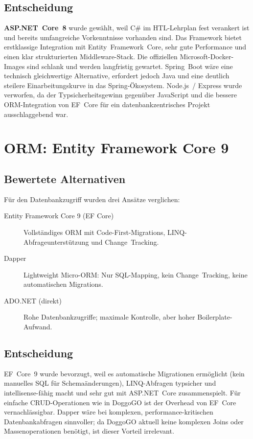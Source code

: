 \subsection{Entscheidung}
\label{subsec:aspnet-entscheidung}

\textbf{ASP.NET~Core~8} wurde gewählt, weil C\# im HTL-Lehrplan fest verankert ist und
bereits umfangreiche Vorkenntnisse vorhanden sind. Das Framework bietet erstklassige
Integration mit Entity~Framework~Core, sehr gute Performance und einen klar strukturierten
Middleware-Stack. Die offiziellen Microsoft-Docker-Images sind schlank und werden langfristig
gewartet. Spring~Boot wäre eine technisch gleichwertige Alternative, erfordert jedoch Java
und eine deutlich steilere Einarbeitungskurve in das Spring-Ökosystem. Node.js~/ Express
wurde verworfen, da der Typsicherheitsgewinn gegenüber JavaScript und die bessere
ORM-Integration von EF~Core für ein datenbankzentrisches Projekt ausschlaggebend war.

\section{ORM: Entity Framework Core 9}
\label{sec:efcore}

\subsection{Bewertete Alternativen}
\label{subsec:orm-alternativen}

Für den Datenbankzugriff wurden drei Ansätze verglichen:

\begin{description}
  \item[Entity Framework Core 9 (EF Core)] Vollständiges ORM mit Code-First-Migrations,
    LINQ-Abfrageunterstützung und Change~Tracking.
  \item[Dapper] Lightweight Micro-ORM: Nur SQL-Mapping, kein Change~Tracking, keine
    automatischen Migrations.
  \item[ADO.NET (direkt)] Rohe Datenbankzugriffe; maximale Kontrolle, aber hoher
    Boilerplate-Aufwand.
\end{description}

\subsection{Entscheidung}
\label{subsec:efcore-entscheidung}

EF~Core~9 wurde bevorzugt, weil es automatische Migrationen ermöglicht (kein manuelles
SQL für Schemaänderungen), LINQ-Abfragen typsicher und intellisense-fähig macht und
sehr gut mit ASP.NET~Core zusammenspielt. Für einfache CRUD-Operationen wie in DoggoGO
ist der Overhead von EF~Core vernachlässigbar. Dapper wäre bei komplexen, performance-kritischen
Datenbankabfragen sinnvoller; da DoggoGO aktuell keine komplexen Joins oder Massenoperationen
benötigt, ist dieser Vorteil irrelevant.

